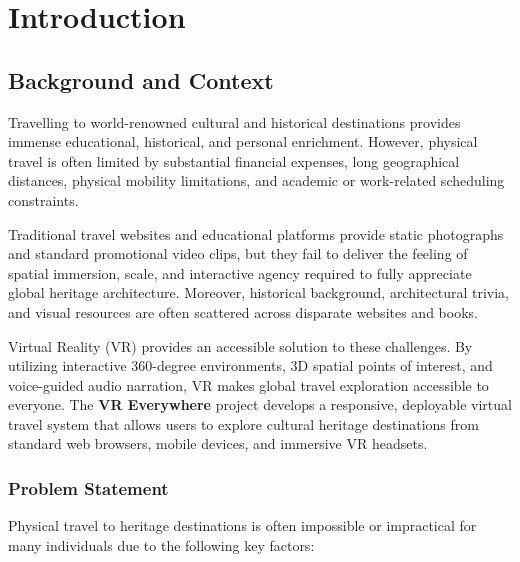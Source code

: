 \documentclass{tietreport}
\author{%
  \texttt{1024170428} Abishek Garg \\
  \texttt{1024170432} Deepak \\
  \texttt{1024170436} Harnoor Kaur Dran%
}
\begin{document}
\maketitle
\clearpage

\tableofcontents
\clearpage


\chapter{Introduction}

\section{Background and Context}

Travelling to world-renowned cultural and historical destinations provides immense educational, historical, and personal enrichment. However, physical travel is often limited by substantial financial expenses, long geographical distances, physical mobility limitations, and academic or work-related scheduling constraints.

Traditional travel websites and educational platforms provide static photographs and standard promotional video clips, but they fail to deliver the feeling of spatial immersion, scale, and interactive agency required to fully appreciate global heritage architecture. Moreover, historical background, architectural trivia, and visual resources are often scattered across disparate websites and books.

Virtual Reality (VR) provides an accessible solution to these challenges. By utilizing interactive 360-degree environments, 3D spatial points of interest, and voice-guided audio narration, VR makes global travel exploration accessible to everyone. The \textbf{VR Everywhere} project develops a responsive, deployable virtual travel system that allows users to explore cultural heritage destinations from standard web browsers, mobile devices, and immersive VR headsets.

\subsection{Problem Statement}

Physical travel to heritage destinations is often impossible or impractical for many individuals due to the following key factors:
\end{document}
